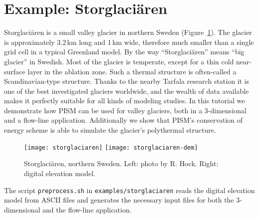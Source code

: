 
\section{Example: Storglaci{\"a}ren}\label{sec:storglaciaren} 

Storglaci{\"a}ren is a small valley glacier in northern Sweden (Figure~\ref{fig:storglaciaren}). The glacier is approximately 3.2\,km long and 1\,km wide, therefore much smaller than a single grid cell in a typical Greenland model. By the way ``Storglaci{\"a}ren'' means ``big glacier'' in Swedish. Most of the glacier is temperate, except for a thin cold near-surface layer in the ablation zone. Such a thermal structure is often-called a Scandinavian-type structure. Thanks to the nearby Tarfala research station it is one of the best investigated glaciers worldwide, and the wealth of data available makes it perfectly suitable for all kinds of modeling studies. In this tutorial we demonstrate how PISM can be used for valley glaciers, both in a 3-dimensional and a flow-line application. Additionally we show that PISM's conservation of energy scheme is able to simulate the glacier's polythermal structure.

\begin{figure}[ht]
  \centering
  \texttt{[image: storglaciaren]}\qquad
  \texttt{[image: storglaciaren-dem]}
  \caption{Storglaci{\"a}ren, northern Sweden. Left: photo by R. Hock. Right: digital elevation model.}
  \label{fig:storglaciaren}
\end{figure}

The script \texttt{preprocess.sh} in \texttt{examples/storglaciaren} reads the digital elevation model from ASCII files and generates the necessary input files for both the 3-dimensional and the flow-line application. 
